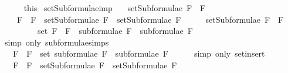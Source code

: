\begin{isabellebody}
\ \ \ \ \isamarkupfalse%
\ this\isanewline
{}\isamarkupfalse%
%
\endisatagproof
{\isafoldproof}%
%
\isadelimproof
\isanewline
%
\endisadelimproof
\isanewline
{}\isamarkupfalse%
\ setSubformulae{\isacharunderscore}imp{\isacharcolon}\ \isanewline
\ \ {\isachardoublequoteopen}setSubformulae\ {\isacharparenleft}F{}\ \isactrlbold {\isasymrightarrow}\ F{}{\isacharparenright}\ \isanewline
\ \ \ {\isacharequal}\ {\isacharbraceleft}F{}\ \isactrlbold {\isasymrightarrow}\ F{}{\isacharbraceright}\ {\isasymunion}\ {\isacharparenleft}setSubformulae\ F{}\ {\isasymunion}\ setSubformulae\ F{}{\isacharparenright}{\isachardoublequoteclose}\isanewline
%
\isadelimproof
%
\endisadelimproof
%
\isatagproof
{}\isamarkupfalse%
\ {\isacharminus}\isanewline
\ \ \isamarkupfalse%
\ {\isachardoublequoteopen}setSubformulae\ {\isacharparenleft}F{}\ \isactrlbold {\isasymrightarrow}\ F{}{\isacharparenright}\ \isanewline
\ \ \ \ \ \ \ \ {\isacharequal}\ set\ {\isacharparenleft}{\isacharparenleft}F{}\ \isactrlbold {\isasymrightarrow}\ F{}{\isacharparenright}\ {\isacharhash}\ {\isacharparenleft}subformulae\ F{}\ {\isacharat}\ subformulae\ F{}{\isacharparenright}{\isacharparenright}{\isachardoublequoteclose}\isanewline
\ \ \ \ \isamarkupfalse%
\ {\isacharparenleft}simp\ only{\isacharcolon}\ subformulae{\isachardot}simps{\isacharparenleft}{}{\isacharparenright}{\isacharparenright}\isanewline
\ \ \isamarkupfalse%
\ \isamarkupfalse%
\ {\isachardoublequoteopen}{\isasymdots}\ {\isacharequal}\ {\isacharbraceleft}F{}\ \isactrlbold {\isasymrightarrow}\ F{}{\isacharbraceright}\ {\isasymunion}\ {\isacharparenleft}set\ {\isacharparenleft}subformulae\ F{}\ {\isacharat}\ subformulae\ F{}{\isacharparenright}{\isacharparenright}{\isachardoublequoteclose}\isanewline
\ \ \ \ \isamarkupfalse%
\ {\isacharparenleft}simp\ only{\isacharcolon}\ set{\isacharunderscore}insert{\isacharparenright}\isanewline
\ \ \isamarkupfalse%
\ \isamarkupfalse%
\ {\isachardoublequoteopen}{\isasymdots}\ {\isacharequal}\ {\isacharbraceleft}F{}\ \isactrlbold {\isasymrightarrow}\ F{}{\isacharbraceright}\ {\isasymunion}\ {\isacharparenleft}setSubformulae\ F{}\ {\isasymunion}\ setSubformulae\ F{}{\isacharparenright}{\isachardoublequoteclose}\isanewline

\end{isabellebody}
